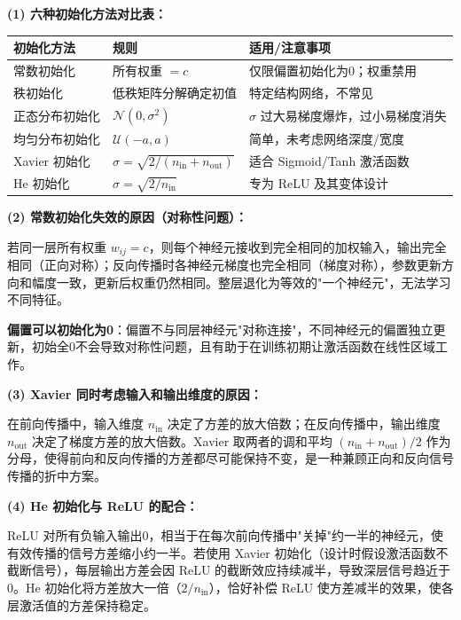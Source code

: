 \documentclass[a4paper,11pt]{ctexart}
\begin{document}
\begin{solutionbox}[参考答案与详细解析]
    \textbf{(1) 六种初始化方法对比表：}

    \begin{center}
    \begin{tabular}{p{2.8cm} p{4.5cm} p{3.8cm}}
        \toprule
        初始化方法 & 规则 & 适用/注意事项 \\
        \midrule
        常数初始化 & 所有权重 $= c$ & 仅限偏置初始化为0；权重禁用 \\[0.8em]
        秩初始化 & 低秩矩阵分解确定初值 & 特定结构网络，不常见 \\[0.8em]
        正态分布初始化 & $\mathcal{N}(0, \sigma^2)$ & $\sigma$ 过大易梯度爆炸，过小易梯度消失 \\[0.8em]
        均匀分布初始化 & $\mathcal{U}(-a, a)$ & 简单，未考虑网络深度/宽度 \\[0.8em]
        Xavier 初始化 & $\sigma=\sqrt{2/(n_{\text{in}}+n_{\text{out}})}$ & 适合 Sigmoid/Tanh 激活函数 \\[0.8em]
        He 初始化 & $\sigma=\sqrt{2/n_{\text{in}}}$ & 专为 ReLU 及其变体设计 \\
        \bottomrule
    \end{tabular}
    \end{center}

    \textbf{(2) 常数初始化失效的原因（对称性问题）：}

    若同一层所有权重 $w_{ij}=c$，则每个神经元接收到完全相同的加权输入，输出完全相同（正向对称）；反向传播时各神经元梯度也完全相同（梯度对称），参数更新方向和幅度一致，更新后权重仍然相同。整层退化为等效的"一个神经元"，无法学习不同特征。

    \textbf{偏置可以初始化为0}：偏置不与同层神经元"对称连接"，不同神经元的偏置独立更新，初始全0不会导致对称性问题，且有助于在训练初期让激活函数在线性区域工作。

    \textbf{(3) Xavier 同时考虑输入和输出维度的原因：}

    在前向传播中，输入维度 $n_{\text{in}}$ 决定了方差的放大倍数；在反向传播中，输出维度 $n_{\text{out}}$ 决定了梯度方差的放大倍数。Xavier 取两者的调和平均 $(n_{\text{in}}+n_{\text{out}})/2$ 作为分母，使得前向和反向传播的方差都尽可能保持不变，是一种兼顾正向和反向信号传播的折中方案。

    \textbf{(4) He 初始化与 ReLU 的配合：}

    ReLU 对所有负输入输出0，相当于在每次前向传播中"关掉"约一半的神经元，使有效传播的信号方差缩小约一半。若使用 Xavier 初始化（设计时假设激活函数不截断信号），每层输出方差会因 ReLU 的截断效应持续减半，导致深层信号趋近于0。He 初始化将方差放大一倍（$2/n_{\text{in}}$），恰好补偿 ReLU 使方差减半的效果，使各层激活值的方差保持稳定。


\end{solutionbox}
\end{document}
